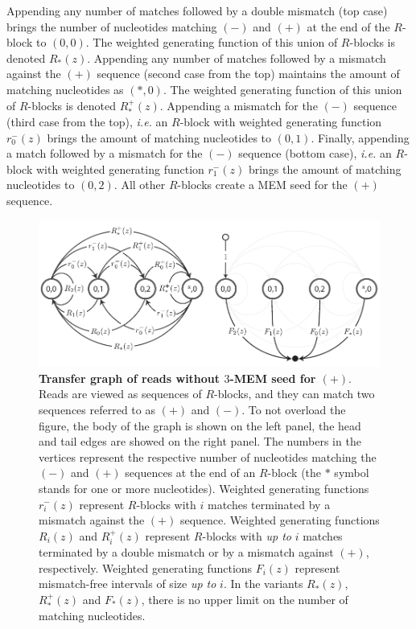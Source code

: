 \documentclass{article}
\begin{document}
Appending any number of matches followed by a double mismatch (top case)
brings the number of nucleotides matching $(-)$ and $(+)$ at the end of
the $R$-block to $(0,0)$. The weighted generating function of this union
of $R$-blocks is denoted $R_*(z)$. Appending any number of matches
followed by a mismatch against the $(+)$ sequence (second case from the
top) maintains the amount of matching nucleotides as $(*,0)$. The weighted
generating function of this union of $R$-blocks is denoted $R_*^+(z)$.
Appending a mismatch for the $(-)$ sequence (third case from the top),
\textit{i.e.} an $R$-block with weighted generating function $r_0^-(z)$
brings the amount of matching nucleotides to $(0,1)$. Finally, appending a
match followed by a mismatch for the $(-)$ sequence (bottom case),
\textit{i.e.} an $R$-block with weighted generating function $r_1^-(z)$
brings the amount of matching nucleotides to $(0,2)$. All other $R$-blocks
create a MEM seed for the $(+)$ sequence.



\begin{figure}[h]
\centering
\includegraphics[scale=0.79]{MEM_graph.pdf}
\caption{\textbf{Transfer graph of reads without $3$-MEM seed for $(+)$}.
Reads are viewed as sequences of $R$-blocks, and they can match two
sequences referred to as $(+)$ and $(-)$. To not overload the figure, the
body of the graph is shown on the left panel, the head and tail edges are
showed on the right panel. The numbers in the vertices represent the
respective number of nucleotides matching the $(-)$ and $(+)$ sequences at
the end of an $R$-block (the $*$ symbol stands for one or more
nucleotides). Weighted generating functions $r_i^-(z)$ represent
$R$-blocks with $i$ matches terminated by a mismatch against the $(+)$
sequence. Weighted generating functions $R_i(z)$ and $R_i^+(z)$ represent
$R$-blocks with \emph{up to} $i$ matches terminated by a double mismatch
or by a mismatch against $(+)$, respectively. Weighted generating
functions $F_i(z)$ represent mismatch-free intervals of size \emph{up to}
$i$. In the variants $R_*(z)$, $R_*^+(z)$ and $F_*(z)$, there is no upper
limit on the number of matching nucleotides.}
\label{fig:graph_mem}
\end{figure}
\end{document}
